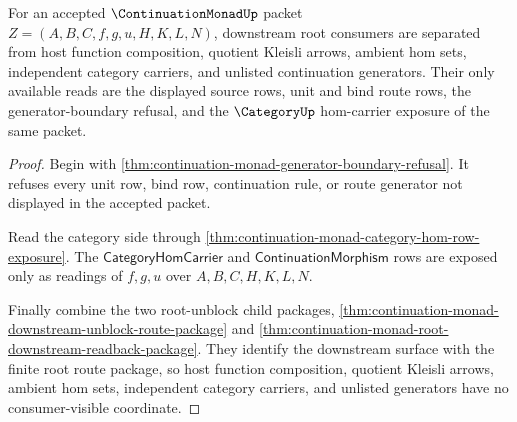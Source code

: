 \begin{theorem}
\label{thm:continuation-monad-root-downstream-consumer-separation}
For an accepted $\ContinuationMonadUp$ packet $Z=(A,B,C,f,g,u,H,K,L,N)$, downstream root consumers are separated from host function composition, quotient Kleisli arrows, ambient hom sets, independent category carriers, and unlisted continuation generators. Their only available reads are the displayed source rows, unit and bind route rows, the generator-boundary refusal, and the $\CategoryUp$ hom-carrier exposure of the same packet.
\end{theorem}
\begin{proof}
Begin with \autoref{thm:continuation-monad-generator-boundary-refusal}. It refuses every unit row, bind row, continuation rule, or route generator not displayed in the accepted packet.

Read the category side through \autoref{thm:continuation-monad-category-hom-row-exposure}. The $\mathsf{CategoryHomCarrier}$ and $\mathsf{ContinuationMorphism}$ rows are exposed only as readings of $f,g,u$ over $A,B,C,H,K,L,N$.

Finally combine the two root-unblock child packages, \autoref{thm:continuation-monad-downstream-unblock-route-package} and \autoref{thm:continuation-monad-root-downstream-readback-package}. They identify the downstream surface with the finite root route package, so host function composition, quotient Kleisli arrows, ambient hom sets, independent category carriers, and unlisted generators have no consumer-visible coordinate.
\end{proof}

